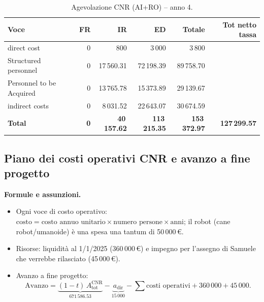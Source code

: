 \documentclass{plan4ari_report}
\begin{document}
\begin{table}[H]\centering\footnotesize\caption{Agevolazione CNR (AI+RO) -- anno 4.}\label{tab:cnr-y4}
\begin{tabular}{lrrrrr}\toprule\textbf{Voce} & \textbf{FR} & \textbf{IR} & \textbf{ED} & \textbf{Totale} & \textbf{Tot netto tassa} \\\midrule
\quad direct cost & 0 & 800 & 3\,000 & 3\,800 &  \\
\quad Structured personnel & 0 & 17\,560.31 & 72\,198.39 & 89\,758.70 &  \\
\quad Personnel to be Acquired & 0 & 13\,765.78 & 15\,373.89 & 29\,139.67 &  \\
\quad indirect costs & 0 & 8\,031.52 & 22\,643.07 & 30\,674.59 &  \\
\midrule\textbf{Total} & \textbf{0} & \textbf{40\,157.62} & \textbf{113\,215.35} & \textbf{153\,372.97} & \textbf{127\,299.57} \\
\bottomrule\end{tabular}\end{table}


\subsection{Piano dei costi operativi CNR e avanzo a fine progetto}
\textbf{Formule e assunzioni.}
\begin{itemize}
  \item Ogni voce di costo operativo: $\text{costo} = \text{costo annuo unitario}\times\text{numero persone}\times\text{anni}$; il robot (cane robot/umanoide) \`e una spesa una tantum di 50\,000\,\euro.
  \item Risorse: liquidit\`a al 1/1/2025 (360\,000\,\euro) e impegno per l'assegno di Samuele che verrebbe rilasciato (45\,000\,\euro).
  \item Avanzo a fine progetto:
  \[
    \text{Avanzo} = \underbrace{(1-t)\,A^{\mathrm{CNR}}_{\mathrm{tot}}}_{671\,586.53} - \underbrace{a_{\mathrm{dir}}}_{15\,000} - \sum \text{costi operativi} + 360\,000 + 45\,000 .
  \]
\end{itemize}
\end{document}
